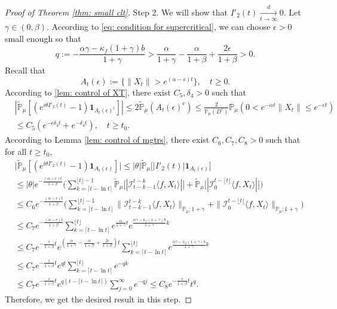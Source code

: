 \documentclass[12pt,a4paper]{amsart}
\theoremstyle{plain}
\theoremstyle{definition}
\numberwithin{equation}{section}
\begin{document}
\begin{proof}[Proof of Theorem \ref{thm: small clt}]
	Step 2.
	We will show that $I'_2(t)\xrightarrow[t\to \infty]{d} 0$.
	Let $\gamma \in (0,\beta)$.
	According to \eqref{eq: condition for supercritical}, we can choose $\epsilon > 0$ small enough so that
\[
	q:= - \frac{\alpha \gamma-\kappa_f(1+\gamma)b}{1+\gamma}
	> \frac{\alpha}{1+\gamma}-\frac{\alpha}{1+\beta} + \frac{2\epsilon}{1+\beta} > 0.
\]
	Recall that
\[
	A_t(\epsilon)
    :=\{\|X_t\|>e^{(\alpha-\epsilon )t}\},
	\quad t\geq 0.
\]
	According to \eqref{lem: control of XT}, there exist
$C_5,\delta_4>0$ such that
\begin{align}
    &|\mathbb{\widetilde{P}}_{\mu}[(e^{i\theta I'_2(t)}-1)\mathbf{1}_{A_t(\epsilon)^c}]|
    \leq 2\mathbb{\widetilde{P}}_{\mu}(A_t(\epsilon)^c)\leq \frac{2}{\mathbb{P}_{\mu}(D^c)}\mathbb{P}_{\mu}(0<e^{-\alpha t}\|X_t\|\leq e^{-\epsilon t})
    \\&\leq C_5(e^{-\epsilon\delta_4 t}+e^{-\delta_4 t}),
    \quad t\geq t_0.
\end{align}
	According to Lemma \ref{lem: control of mgtrs}, there exist $C_6,C_7,C_8>0$ such that for all
	$t\ge t_0$,
\begin{align}
    &\big|\mathbb{\widetilde{P}}_{\mu} [ (e^{i\theta I'_2(t)}-1)\mathbf{1}_{A_t(\epsilon)}]\big|
    \leq |\theta| \mathbb{\widetilde{P}}_{\mu} \big[ |I'_2(t)|\mathbf{1}_{A_t(\epsilon)}\big]
    \\&\leq|\theta| e^{-\frac{(\alpha - \epsilon )t}{1+\beta}} \Big(\sum_{k=\lceil t-\ln t \rceil}^{\lfloor t \rfloor - 1}\mathbb{\widetilde{P}}_{\mu}\big[| \mathcal{I}_{t-k-1}^{t-k}\langle f,X_t\rangle|\big] + \mathbb{\widetilde{P}}_{\mu}\big[| \mathcal{I}_{0}^{t-\lfloor t\rfloor}\langle f,X_t\rangle|\big]\Big)
    \\& \leq C_6  e^{-\frac{(\alpha - \epsilon )t}{1+\beta}} \Big(\sum_{k=\lceil t-\ln t \rceil}^{\lfloor t \rfloor - 1}\|\mathcal{I}_{t-k-1}^{t-k}\langle f,X_t\rangle\|_{\mathbb P_\mu; 1+\gamma} + \|\mathcal I_0^{t-\lfloor t \rfloor} \langle f, X_t\rangle\|_{\mathbb P_\mu;1+\gamma}\Big)
    \\ &\leq C_7  e^{-\frac{(\alpha - \epsilon )t}{1+\beta}} \sum_{k=\lceil t-\ln t \rceil}^{\lfloor t \rfloor}e^{\frac{\alpha}{1+\gamma}t}e^{\frac{\alpha\gamma-\kappa_f(1+\gamma)b}{1+\gamma}k}\\
    &\leq C_7 e^{-\frac{\epsilon}{1+\beta} t}e^{(\frac{\alpha }{1+\gamma}-\frac{\alpha }{1+\beta} + \frac{2\epsilon}{1+\beta})t} \sum_{k=\lceil t-\ln t \rceil}^{\lfloor t \rfloor}e^{\frac{\alpha\gamma-\kappa_f(1+\gamma)b}{1+\gamma}k}\\
    &\leq C_7 e^{-\frac{\epsilon}{1+\beta} t} e^{qt} \sum_{k=\lceil t-\ln t \rceil}^{\lfloor t \rfloor}e^{-qk}\\
    &\leq C_7 e^{-\frac{\epsilon}{1+\beta} t} e^{q(t - \lceil t - \ln t\rceil)} \sum_{j=0}^{\infty}e^{-qj}\leq C_8 e^{-\frac{\epsilon}{1+\beta} t} t^q.
\end{align}
	Therefore, we get the desired result in this step.


\end{proof}
\end{document}
